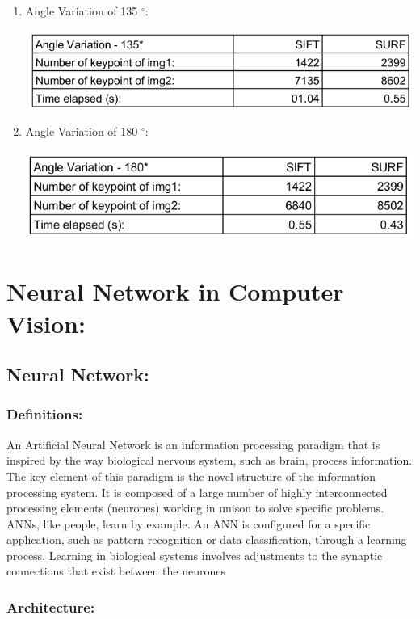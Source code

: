 \begin{enumerate}
\item Angle Variation of 135 $^{\circ}$:
\begin{center}
\includegraphics[scale=0.3]{angle-135.png}
\end{center}
\item Angle Variation of 180 $^{\circ}$:
\begin{center}
\includegraphics[scale=0.3]{angle-180.png}
\end{center}
\end{enumerate}



\section{Neural Network in Computer Vision:}
\subsection{Neural Network:}
\subsubsection{Definitions:}
An Artificial Neural Network is an information processing paradigm that is inspired by the way biological nervous system, such as brain, process information. The key element of this paradigm is the novel structure of the information processing system. It is composed of a large number of highly interconnected processing elements (neurones) working in unison to solve specific problems. ANNs, like people, learn by example. An ANN is configured for a specific application, such as pattern recognition or data classification, through a learning process. Learning in biological systems involves adjustments to the synaptic connections that exist between the neurones
\subsubsection{Architecture:}

